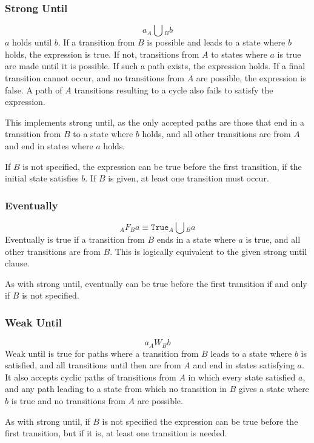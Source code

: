 \documentclass[a4paper,11pt]{article}
\begin{document}
	\subsubsection{Strong Until}
	$$a _A\bigcup{_B b} $$
	$a$ holds until $b$. If a transition from $B$ is possible and leads to a state where $b$ holds, the expression is true. If not, transitions from $A$ to states where $a$ is true are made until it is possible. If such a path exists, the expression holds. If a final transition cannot occur, and no transitions from $A$ are possible, the expression is false. A path of $A$ transitions resulting to a cycle also fails to satisfy the expression.
	
	This implements strong until, as the only accepted paths are those that end in a transition from $B$ to a state where $b$ holds, and all other transitions are from $A$ and end in states where $a$ holds.
	
	If $B$ is not specified, the expression can be true before the first transition, if the initial state satisfies $b$. If $B$ is given, at least one transition must occur.
	
	\subsubsection{Eventually}
	$$_A F{_Ba} \equiv \texttt{True} _A\bigcup{_B a} $$
	Eventually is true if a transition from $B$ ends in a state where $a$ is true, and all other transitions are from $B$. This is logically equivalent to the given strong until clause.
	
	As with strong until, eventually can be true before the first transition if and only if $B$ is not specified.
	
	\subsubsection{Weak Until}
	$$a _A W{_B b} $$
	Weak until is true for paths where a transition from $B$ leads to a state where $b$ is satisfied, and all transitions until then are from $A$ and end in states satisfying $a$. It also accepts cyclic paths of transitions from $A$ in which every state satisfied $a$, and any path leading to a state from which no transition in $B$ gives a state where $b$ is true and no transitions from $A$ are possible.
	
	As with strong until, if $B$ is not specified the expression can be true before the first transition, but if it is, at least one transition is needed.
	
\end{document}
